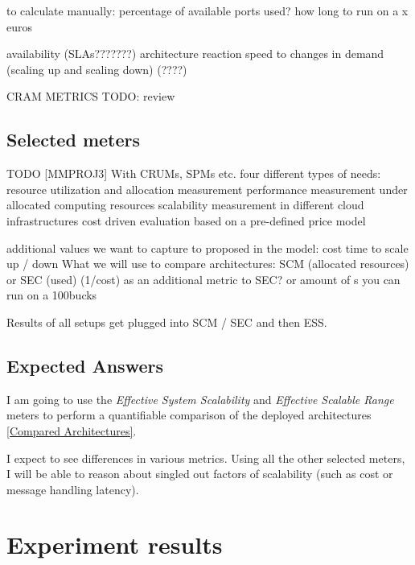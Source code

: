 \documentclass{uvamscse}
\begin{document}
to calculate manually:
percentage of available ports used?
how long to run on a x euros


availability (SLAs???????)
architecture reaction speed to changes in demand (scaling up and scaling down) (????)

CRAM METRICS
TODO: review

\section{Selected meters}\label{Selected meters}
TODO
[MMPROJ3] With CRUMs, SPMs etc.
four different types of needs:
resource utilization and allocation measurement
performance measurement under allocated computing resources
scalability measurement in different cloud infrastructures
cost driven evaluation based on a pre-defined price model

additional values we want to capture to proposed in the model:
cost
time to scale up / down
What we will use to compare architectures:
SCM (allocated resources) or SEC (used)
(1/cost) as an additional metric to SEC? or amount of s you can run on a 100bucks

Results of all setups get plugged into SCM / SEC and then ESS.

\section{Expected Answers}\label{Expected Answers}
I am going to use the \textit{Effective System Scalability} and \textit{Effective Scalable Range} meters to perform a quantifiable comparison of the deployed architectures \ref{Compared Architectures}.

I expect to see differences in various metrics. Using all the other selected meters, I will be able to reason about singled out factors of scalability (such as cost or message handling latency).


\chapter{Experiment results}\label{Experiment results}


\end{document}
